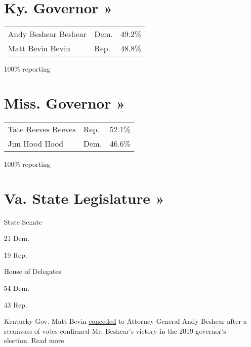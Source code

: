 \href{https://www.nytimes3xbfgragh.onion/interactive/2019/11/05/us/elections/results-kentucky-governor-general-election.html}{}

\hypertarget{ky-governor-}{%
\section{Ky. Governor »}\label{ky-governor-}}

\begin{longtable}[]{@{}lll@{}}
\toprule
\endhead
 Andy Beshear Beshear & Dem. & 49.2\%\tabularnewline
 Matt Bevin Bevin & Rep. & 48.8\%\tabularnewline
\bottomrule
\end{longtable}

100\% reporting

\href{https://www.nytimes3xbfgragh.onion/interactive/2019/11/05/us/elections/results-mississippi-governor-general-election.html}{}

\hypertarget{miss-governor-}{%
\section{Miss. Governor »}\label{miss-governor-}}

\begin{longtable}[]{@{}lll@{}}
\toprule
\endhead
 Tate Reeves Reeves & Rep. & 52.1\%\tabularnewline
 Jim Hood Hood & Dem. & 46.6\%\tabularnewline
\bottomrule
\end{longtable}

100\% reporting

\href{https://www.nytimes3xbfgragh.onion/interactive/2019/11/05/us/elections/results-virginia-general-elections.html}{}

\hypertarget{va-state-legislature-}{%
\section{Va. State Legislature »}\label{va-state-legislature-}}

State Senate

21 Dem.

19 Rep.

House of Delegates

54 Dem.

43 Rep.

Kentucky Gov. Matt Bevin
\href{https://www.nytimes3xbfgragh.onion/2019/11/14/us/kentucky-governor-recanvass-bevin.html}{conceded}
to Attorney General Andy Beshear after a recanvass of votes confirmed
Mr. Beshear's victory in the 2019 governor's election. Read more

